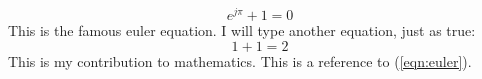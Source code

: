 \documentclass[a4paper]{article}
\begin{document}
\begin{equation}
    \label{eqn:euler}
    e^{j\pi} + 1 = 0
\end{equation}
This is the famous euler equation. I 
will type another equation, just as
true:
\begin{equation}
    \label{eqn:simple}
    1 + 1 = 2
\end{equation}
This is my contribution to mathematics.
This is a reference to (\ref{eqn:euler}).
\end{document}
